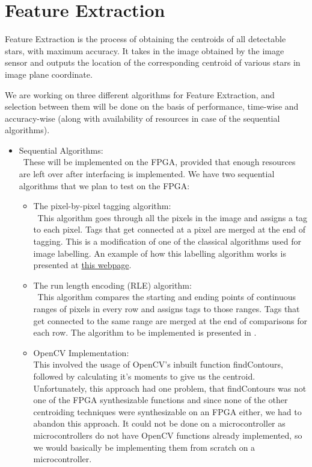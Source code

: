 \documentclass[../../main.tex]{subfiles}
\begin{document}
\section{Feature Extraction}
\thispagestyle{fancy}

Feature Extraction is the process of obtaining the centroids of all detectable stars, with maximum accuracy. It takes in the image obtained by the image sensor and outputs the location of the corresponding centroid of various stars in image plane coordinate.

We are working on three different algorithms for Feature Extraction, and selection between them will be done on the basis of performance, time-wise and accuracy-wise (along with availability of resources in case of the sequential algorithms).
\begin{itemize}
    \item Sequential Algorithms:\\
    \ These will be implemented on the FPGA, provided that enough resources are left over after interfacing is implemented. We have two sequential algorithms that we plan to test on the FPGA:
    \begin{itemize}
        \item The pixel-by-pixel tagging algorithm:\\
        \ This algorithm goes through all the pixels in the image and assigns a tag to each pixel. Tags that get connected at a pixel are merged at the end of tagging. This is a modification of one of the classical algorithms used for image labelling. An example of how this labelling algorithm works is presented at \href{https://aishack.in/tutorials/labelling-connected-components-example/}{this webpage}.
        \item The run length encoding (RLE) algorithm:\\
        \ This algorithm compares the starting and ending points of continuous ranges of pixels in every row and assigns tags to those ranges. Tags that get connected to the same range are merged at the end of comparisons for each row. The algorithm to be implemented is presented in \cite{fe_blob_detection}.
        \item OpenCV Implementation:\\
        This involved the usage of OpenCV's inbuilt function findContours, followed by calculating it's moments to give us the centroid. Unfortunately, this approach had one problem, that findContours was not one of the FPGA synthesizable functions and since none of the other centroiding techniques were synthesizable on an FPGA either, we had to abandon this approach. It could not be done on a microcontroller as microcontrollers do not have OpenCV functions already implemented, so we would basically be implementing them from scratch on a microcontroller.

\end{itemize}
\end{itemize}
\end{document}
